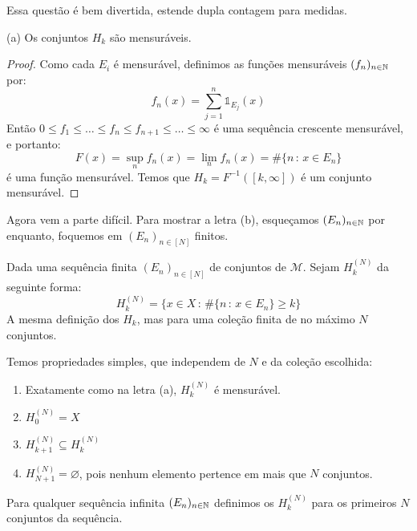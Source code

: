 \prob
Essa questão é bem divertida, estende dupla contagem para medidas.

\begin{prop}
    (a) Os conjuntos $H_k$ são mensuráveis.
\end{prop}
\begin{proof}
    Como cada $E_i$ é mensurável, definimos as funções mensuráveis $(f_n)_{n \in \mathbb{N}}$ por:
    $$f_n(x) = \sum_{j = 1}^{n} \mathds{1}_{E_j}(x)$$
    Então $0 \leq f_1 \leq \dots \leq f_n \leq f_{n+1} \leq \dots \leq \infty$ é uma sequência crescente
    mensurável, e portanto: 
    $$F(x) = \sup_n f_n(x) = \lim_n f_n(x) = \#\{n \, : \, x \in E_n \}$$
    é uma função mensurável. Temos que $H_k = F^{-1}([k,\infty])$ é um conjunto mensurável.
\end{proof}

Agora vem a parte difícil. Para mostrar a letra (b), esqueçamos $(E_n)_{n \in \mathbb{N}}$ por enquanto, foquemos
em $(E_n)_{n \in [N]}$ finitos.

\begin{definition}
    Dada uma sequência finita $(E_n)_{n \in [N]}$ de conjuntos de $\mathcal{M}$. Sejam $H_k^{(N)}$ da seguinte forma:
    $$H_k^{(N)} = \{x \in X \, : \, \#\{n \, : \, x \in E_n\} \geq k\}$$
    A mesma definição dos $H_k$, mas para uma coleção finita de no máximo $N$ conjuntos.
\end{definition}

\begin{observation}
    Temos propriedades simples, que independem de $N$ e da coleção escolhida:
    \begin{enumerate}
        \item Exatamente como na letra (a), $H_k^{(N)}$ é mensurável.
        \item $H_0^{(N)} = X$
        \item $H_{k+1}^{(N)} \subseteq H_{k}^{(N)}$
        \item $H_{N+1}^{(N)} = \varnothing$, pois nenhum elemento pertence em mais que $N$ conjuntos.
    \end{enumerate}
\end{observation}

Para qualquer sequência infinita $(E_n)_{n\in\mathbb{N}}$ definimos os $H_k^{(N)}$ para os primeiros $N$ conjuntos da sequência.

